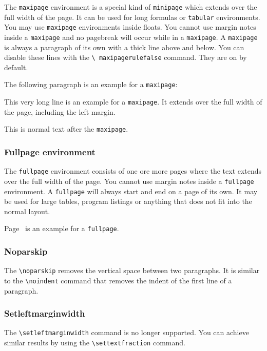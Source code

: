 The \texttt{maxipage} environment is a special kind of 
\texttt{minipage} which extends over the full width of the page. It 
can be used for long formulas or \texttt{tabular} environments. You may 
use \texttt{maxipage} environments inside floats. You cannot use 
margin notes inside a \texttt{maxipage} and no pagebreak will occur 
while in a \texttt{maxipage}. A \texttt{maxipage} is always a 
paragraph of its own with a thick line above and below. You can 
disable these lines with the \texttt{\textbackslash 
maxipagerulefalse}
command. They are on by default.

The following paragraph is an example for a \texttt{maxipage}:
\nopagebreak
\begin{maxipage}
This very long line is an example for a \texttt{maxipage}. It extends 
over the full width of the page, including the left margin.
\end{maxipage}\nopagebreak
This is normal text after the \texttt{maxipage}.

\subsubsection{Fullpage environment} \label{fullpage}

The \texttt{fullpage} environment consists of one ore more pages where 
the text extends over the full width of the page. You cannot use 
margin notes inside a \texttt{fullpage} environment. A \texttt{fullpage} 
will always start and end on a page of its own. It may be used for 
large tables, program listings or anything that does not fit into the 
normal layout.

Page~\pageref{bild} is an example for a \texttt{fullpage}.

\subsubsection{Noparskip}

The \verb|\noparskip| removes the vertical space between two 
paragraphs. It is similar to the \verb|\noindent| command that removes 
the indent of the first line of a paragraph.

\subsubsection{Setleftmarginwidth}

The \verb|\setleftmarginwidth| command is no longer supported. You can 
achieve similar results by using the \verb|\settextfraction| command.

